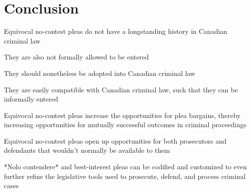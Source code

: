 \chapter{Conclusion}

Equivocal no-contest pleas do not have a longstanding history in Canadian criminal law

They are also not formally allowed to be entered

They should nonetheless be adopted into Canadian criminal law

They are easily compatible with Canadian criminal law, such that they can be informally entered

Equivocal no-contest pleas increase the opportunities for plea bargains, thereby increasing opportunities for mutually successful outcomes in criminal proceedings

Equivocal no-contest pleas open up opportunities for both prosecutors and defendants that wouldn't normally be available to them

*Nolo contendere* and best-interest pleas can be codified and customized to even further refine the legislative tools used to prosecute, defend, and process criminal cases